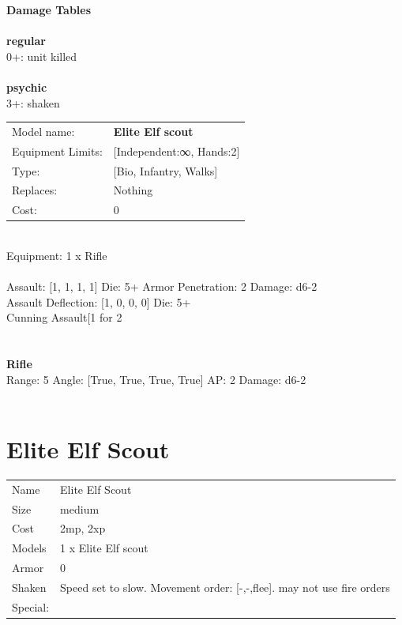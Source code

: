 {\bf Damage Tables} \\
\ \\ {\bf regular } \\
0+: unit killed \\
\ \\ {\bf psychic } \\
3+: shaken \\


\noindent
\begin{tabular}{ll}
Model name: &{\bf Elite Elf scout } \\
Equipment Limits: &[Independent:∞, Hands:2] \\
Type: &[Bio, Infantry, Walks] \\
Replaces: &Nothing \\
Cost: & 0\\
\end{tabular}
\ \\
Equipment: 1 x Rifle \\
\ \\
Assault: [1, 1, 1, 1] Die: 5+ Armor Penetration: 2 Damage: d6-2 \\
Assault Deflection: [1, 0, 0, 0] Die: 5+\\
\indent Cunning Assault[1 for 2\\ 
 
\ \\

\ \\
{\bf Rifle } \\



Range: 5  Angle: [True, True, True, True] AP: 2 Damage: d6-2 \\




 
\ \\













\clearpage

\section{ Elite Elf Scout }

\begin{tabular}{ll}
  Name & Elite Elf Scout \\
  Size & medium\\
  Cost & 2mp, 2xp\\
  Models & 1 x Elite Elf scout\\
  Armor & 0\\
  Shaken & Speed set to slow. Movement order: [-,-,flee]. may not use fire orders\\
  Special: \\
\end{tabular}


